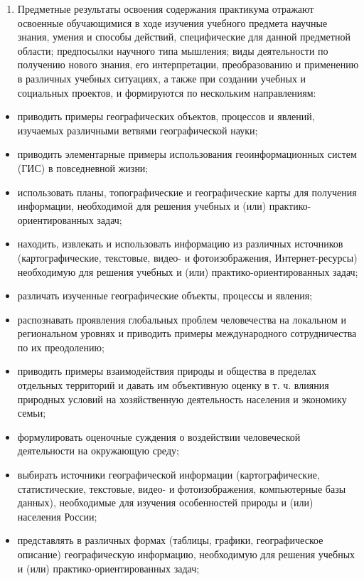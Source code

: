 \documentclass[
  11pt,
]{book}
\providecommand{\tightlist}{%
  \setlength{\itemsep}{0pt}\setlength{\parskip}{0pt}}
\begin{document}
\begin{enumerate}
\def\labelenumi{\arabic{enumi}.}
\setcounter{enumi}{2}
\tightlist
\item
  Предметные результаты освоения содержания практикума отражают освоенные обучающимися в ходе изучения учебного предмета научные знания, умения и способы действий, специфические для данной предметной области; предпосылки научного типа мышления; виды деятельности по получению нового знания, его интерпретации, преобразованию и применению в различных учебных ситуациях, а также при создании учебных и социальных проектов, и формируются по нескольким направлениям:
\end{enumerate}

\begin{itemize}
\item
  приводить примеры географических объектов, процессов и явлений, изучаемых различными ветвями географической науки;
\item
  приводить элементарные примеры использования геоинформационных систем (ГИС) в повседневной жизни;
\item
  использовать планы, топографические и географические карты для получения информации, необходимой для решения учебных и (или) практико-ориентированных задач;
\item
  находить, извлекать и использовать информацию из различных источников (картографические, текстовые, видео- и фотоизображения, Интернет-ресурсы) необходимую для решения учебных и (или) практико-ориентированных задач;
\item
  различать изученные географические объекты, процессы и явления;
\item
  распознавать проявления глобальных проблем человечества на локальном и региональном уровнях и приводить примеры международного сотрудничества по их преодолению;
\item
  приводить примеры взаимодействия природы и общества в пределах отдельных территорий и давать им объективную оценку в т. ч. влияния природных условий на хозяйственную деятельность населения и экономику семьи;
\item
  формулировать оценочные суждения о воздействии человеческой деятельности на окружающую среду;
\item
  выбирать источники географической информации (картографические, статистические, текстовые, видео- и фотоизображения, компьютерные базы данных), необходимые для изучения особенностей природы и (или) населения России;
\item
  представлять в различных формах (таблицы, графики, географическое описание) географическую информацию, необходимую для решения учебных и (или) практико-ориентированных задач;

\end{itemize}
\end{document}
